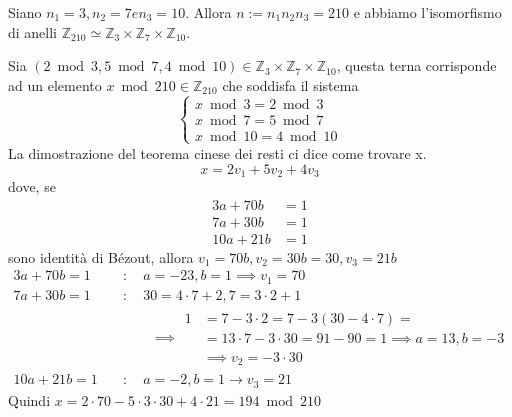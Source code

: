 \documentclass[../main.tex]{subfiles}
\begin{document}
\begin{example}
    Siano $n_1 = 3, n_2 = 7 e n_3 = 10$. Allora $n := n_1 n_2 n_3 = 210$ e abbiamo l'isomorfismo di anelli $\mathbb{Z}_{210} \simeq \mathbb{Z}_3 \times \mathbb{Z}_7 \times \mathbb{Z}_{10}$.

    Sia $(2 \bmod 3, 5 \bmod 7, 4 \bmod 10) \in \mathbb{Z}_3 \times \mathbb{Z}_7 \times \mathbb{Z}_{10}$, questa terna corrisponde ad un elemento $x \bmod 210 \in \mathbb{Z}_{210}$ che soddisfa il sistema
    \begin{equation*}
        \begin{cases}
            x\bmod 3 = 2\bmod 3 \\
            x\bmod 7 = 5\bmod 7 \\
            x\bmod 10 = 4\bmod 10
        \end{cases}
    \end{equation*}
    La dimostrazione del teorema cinese dei resti ci dice come trovare x.
    \begin{equation*}
        x = 2 v_1 + 5 v_2 + 4 v_3
    \end{equation*}
    dove, se
    \begin{align*}
        3 a + 70 b  & = 1 \\
        7 a + 30 b  & = 1 \\
        10 a + 21 b & = 1
    \end{align*}
    sono identità di Bézout, allora $v_1 = 70 b, v_2 = 30 b  = 30, v_3 = 21 b$
    \begin{equation*}
        \begin{aligned}
            3 a + 70 b = 1  & \quad : \quad a = -23, b = 1 \implies v_1 = 70       \\
            7 a + 30 b = 1  & \quad : \quad 30 = 4 \cdot 7 + 2 , 7 = 3 \cdot 2 + 1 \\
                            & \quad \qquad\implies
            \begin{aligned}
                1 & = 7 - 3 \cdot 2 = 7 - 3(30 - 4 \cdot 7) =                        \\
                  & =  13 \cdot 7 - 3 \cdot 30 = 91 - 90 = 1 \implies a = 13, b = -3 \\
                  & \implies v_2 = -3 \cdot 30
            \end{aligned}   \\
            10 a + 21 b = 1 & \quad : \quad  a = -2, b = 1 \rightarrow v_3 = 21
        \end{aligned}
    \end{equation*}
    Quindi $x = 2 \cdot 70 - 5 \cdot 3 \cdot 30 + 4 \cdot 21 = 194\bmod 210$\\
\end{example}
\end{document}
